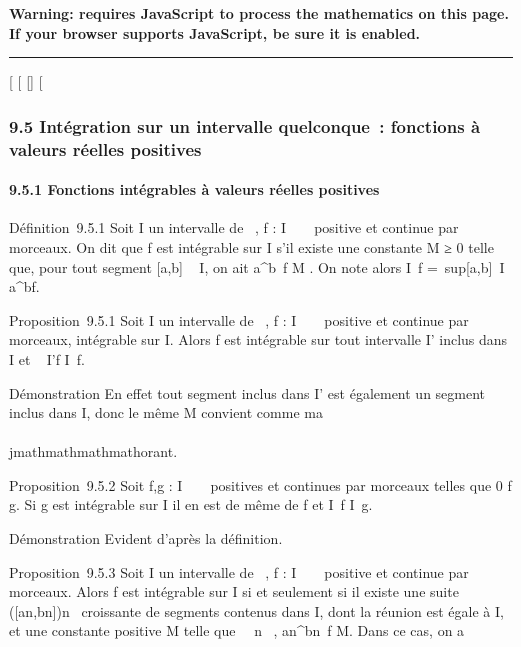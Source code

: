\textbf{Warning: 
requires JavaScript to process the mathematics on this page.\\ If your
browser supports JavaScript, be sure it is enabled.}

\begin{center}\rule{3in}{0.4pt}\end{center}

{[}
{[}
{[}{]}
{[}

\subsubsection{9.5 Intégration sur un intervalle quelconque~: fonctions
à valeurs réelles positives}

\paragraph{9.5.1 Fonctions intégrables à valeurs réelles positives}

Définition~9.5.1 Soit I un intervalle de ~, f : I \rightarrow~ ~ positive et
continue par morceaux. On dit que f est intégrable sur I s'il existe une
constante M ≥ 0 telle que, pour tout segment {[}a,b{]} \subset~ I, on ait
\int  a^b~f \leq M . On note alors
\int  I~f =\
sup{[}a,b{]}\subset~I\int ~
a^bf.

Proposition~9.5.1 Soit I un intervalle de ~, f : I \rightarrow~ ~ positive et
continue par morceaux, intégrable sur I. Alors f est intégrable sur tout
intervalle I' inclus dans I et \int ~
I'f \leq\int  I~f.

Démonstration En effet tout segment inclus dans I' est également un
segment inclus dans I, donc le même M convient comme ma\\\\jmathmathmathmathorant.

Proposition~9.5.2 Soit f,g : I \rightarrow~ ~ positives et continues par morceaux
telles que 0 \leq f \leq g. Si g est intégrable sur I il en est de même de f
et \int  I~f
\leq\int  I~g.

Démonstration Evident d'après la définition.

Proposition~9.5.3 Soit I un intervalle de ~, f : I \rightarrow~ ~ positive et
continue par morceaux. Alors f est intégrable sur I si et seulement si
il existe une suite ({[}an,bn{]})n\in\mathbb{N}~
croissante de segments contenus dans I, dont la réunion est égale à I,
et une constante positive M telle que \forall~~n \in \mathbb{N}~,
\int  an^bn~f
\leq M. Dans ce cas, on a

